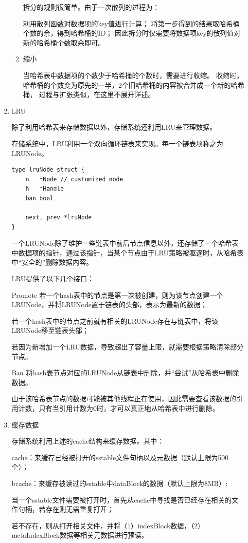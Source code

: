 \begin{enumerate}
\begin{enumerate}
拆分的规则很简单。由于一次散列的过程为：

利用散列函数对数据项的key值进行计算；
将第一步得到的结果取哈希桶个数的余，得到哈希桶的ID；
因此拆分时仅需要将数据项key的散列值对新的哈希桶个数取余即可。
				
				\item 缩小 
				
				当哈希表中数据项的个数少于哈希桶的个数时，需要进行收缩。
				收缩时，哈希桶的个数变为原先的一半，2个旧哈希桶的内容被合并成一个新的哈希桶，
				过程与扩张类似，在这里不展开详述。

			\end{enumerate}
		
		\item LRU 
		
		除了利用哈希表来存储数据以外，存储系统还利用LRU来管理数据。

存储系统中，LRU利用一个双向循环链表来实现。每一个链表项称之为LRUNode。

\begin{lstlisting}[caption=lruNode , label=code_radds_storage_lruNode]
type lruNode struct {
	n   *Node // customized node
	h   *Handle
	ban bool

	next, prev *lruNode
}
\end{lstlisting}

一个LRUNode除了维护一些链表中前后节点信息以外，还存储了一个哈希表中数据项的指针，通过该指针，当某个节点由于LRU策略被驱逐时，从哈希表中“安全的”删除数据内容。

LRU提供了以下几个接口：

Promote
若一个hash表中的节点是第一次被创建，则为该节点创建一个LRUNode，并将LRUNode置于链表的头部，表示为最新的数据；

若一个hash表中的节点之前就有相关的LRUNode存在与链表中，将该LRUNode移至链表头部；

若因为新增加一个LRU数据，导致超出了容量上限，就需要根据策略清除部分节点。

Ban
将hash表节点对应的LRUNode从链表中删除，并“尝试”从哈希表中删除数据。

由于该哈希表节点的数据可能被其他线程正在使用，因此需要查看该数据的引用计数，只有当引用计数为0时，才可以真正地从哈希表中进行删除。

		\item 缓存数据 
		
		存储系统利用上述的cache结构来缓存数据。其中：

cache：来缓存已经被打开的sstable文件句柄以及元数据（默认上限为500个）；

bcache：来缓存被读过的sstable中dataBlock的数据（默认上限为8MB）;

当一个sstable文件需要被打开时，首先从cache中寻找是否已经存在相关的文件句柄，若存在则无需重复打开；

若不存在，则从打开相关文件，并将（1）indexBlock数据，（2）metaIndexBlock数据等相关元数据进行预读。

		\end{enumerate}
		

